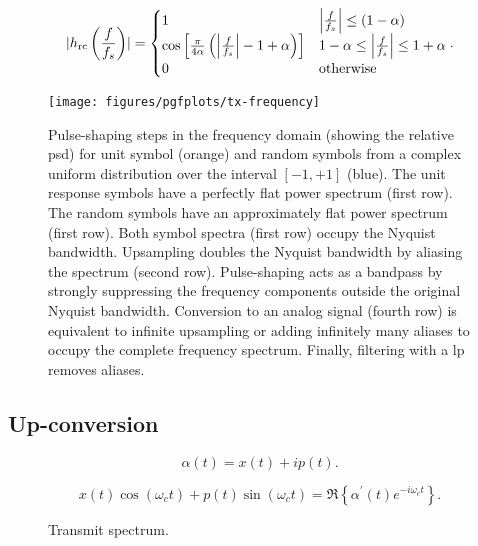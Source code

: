 \begin{equation}
	\abs{h_\text{rc}\left(\frac{f}{f_s}\right)}
	=
	\begin{cases}
		1 & \abs*{\frac{f}{f_s}}\leq(1-\alpha) \\
		\cos\left[\frac{\pi}{4\alpha}\left(\abs*{\frac{f}{f_s}}-1+\alpha\right)\right] & 1-\alpha\leq\abs*{\frac{f}{f_s}}\leq1+\alpha \\
		0 & \text{otherwise}
	\end{cases}
	.
\end{equation}

\begin{figure}[htb]
	\centering
	\texttt{[image: figures/pgfplots/tx-frequency]}
	\caption{Pulse-shaping steps in the frequency domain (showing the relative \gls{psd}) for unit symbol (orange) and random symbols from a complex uniform distribution over the interval $[-1,+1]$ (blue). The unit response symbols have a perfectly flat power spectrum (first row). The random symbols have an approximately flat power spectrum (first row). Both symbol spectra (first row) occupy the Nyquist bandwidth. Upsampling doubles the Nyquist bandwidth by aliasing the spectrum (second row). Pulse-shaping acts as a bandpass by strongly suppressing the frequency components outside the original Nyquist bandwidth. Conversion to an analog signal (fourth row) is equivalent to infinite upsampling or adding infinitely many aliases to occupy the complete frequency spectrum. Finally, filtering with a \gls{lp} removes aliases.}\label{fig:pulse_shaping_freq}
\end{figure}

\subsection{Up-conversion}

\begin{equation}
	\alpha(t)
	=
	x(t)
	+
	ip(t)
	.
\end{equation}

\begin{equation}
	x(t)
	\cos(\omega_ct)
	+
	p(t)
	\sin(\omega_ct)
	=
	\Re\left\{
		\alpha^\prime(t)
		e^{-i\omega_ct}
	\right\}
	\label{eq:passband_signal}.
\end{equation}

\begin{figure}[htb]
	\centering
	\caption{Transmit spectrum.}\label{fig:transmit_spectrum}
\end{figure}